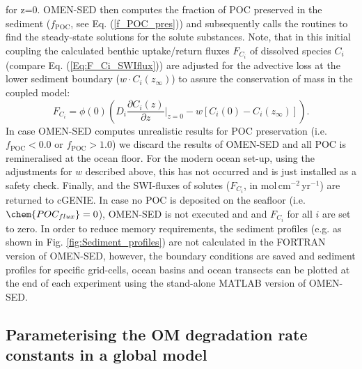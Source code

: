 \documentclass[gmd, manuscript]{copernicus}
\begin{document}
for z=0. 
OMEN-SED then computes the fraction of POC preserved in the sediment ($f_{\mathrm{POC}}$, see Eq. (\ref{f_POC_pres})) and subsequently calls the routines to find the steady-state 
solutions for the solute substances. Note, that in this initial coupling the calculated benthic uptake/return fluxes $F_{C_i}$ of dissolved species $C_i$ (compare Eq. (\ref{Eq:F_Ci_SWIflux})) are 
adjusted for the advective loss at the lower sediment boundary ($w \cdot C_i(z_\infty)$) to assure the conservation of mass in the coupled model:
\begin{equation}
 F_{C_i} = \phi(0) \left(D_i \frac{\partial C_i(z)}{\partial z}\bigg\rvert_{z=0} - w \left[ C_i(0) - C_i(z_\infty) \right]\right).
\end{equation}
In case OMEN-SED computes unrealistic results for POC preservation (i.e. $f_{\mathrm{POC}} < 0.0$ or $f_{\mathrm{POC}} > 1.0$) we discard the results of OMEN-SED and all POC is remineralised at the ocean floor. 
For the modern ocean set-up, using the adjustments for $w$ described above, this has not occurred and is just installed as a safety check. 
Finally,  and the SWI-fluxes of solutes ($F_{C_i}$, in mol\,cm$^{-2}$\,yr$^{-1}$) are returned to cGENIE. 
In case no POC is deposited on the seafloor (i.e. $\chem{POC_{flux}}=0$), OMEN-SED is not executed and  and $F_{C_i}$ for all $i$ are set to zero. 
In order to reduce memory requirements, the sediment profiles (e.g. as shown in Fig. \ref{fig:Sediment_profiles}) are not calculated in the FORTRAN version of OMEN-SED, 
however, the boundary conditions are saved and sediment profiles for specific grid-cells, ocean basins and ocean transects can be plotted at the end of each experiment 
using the stand-alone MATLAB version of OMEN-SED.


\subsection{Parameterising the OM degradation rate constants in a global model}\label{subsec:Parameterising_OM_rate_const}
\end{document}
